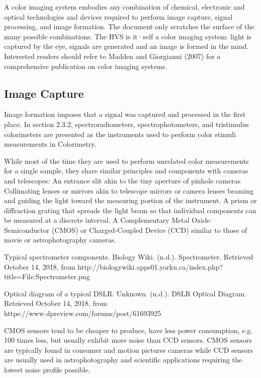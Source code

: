 A color imaging system embodies any combination of chemical, electronic and optical technologies and devices required to perform image capture, signal processing, and image formation. The document only scratches the surface of the many possible combinations. The HVS is it·self a color imaging system: light is captured by the eye, signals are generated and an image is formed in the mind. Interested readers should refer to Madden and Giorgianni (2007) for a comprehensive publication on color imaging systems.

\subsection{Image Capture}

Image formation imposes that a signal was captured and processed in the first place.
In section 2.3.2, spectroradiometers, spectrophotometers, and tristimulus colorimeters are presented as the instruments used to perform color stimuli measurements in Colorimetry.

While most of the time they are used to perform unrelated color measurements for a single sample, they share similar principles and components with cameras and telescopes:
An entrance slit akin to the tiny aperture of pinhole cameras
Collimating lenses or mirrors akin to telescope mirrors or camera lenses beaming and guiding the light toward the measuring portion of the instrument.
A prism or diffraction grating that spreads the light beam so that individual components can be measured at a discrete interval.
A Complementary Metal Oxide Semiconductor (CMOS) or Charged-Coupled Device (CCD) similar to those of movie or astrophotography cameras.

Typical spectrometer components.
Biology Wiki. (n.d.). Spectrometer. Retrieved October 14, 2018, from http://biologywiki.apps01.yorku.ca/index.php?title=File:Spectrometer.png



Optical diagram of a typical DSLR.
Unknown. (n.d.). DSLR Optical Diagram. Retrieved October 14, 2018, from https://www.dpreview.com/forums/post/61693925

CMOS sensors tend to be cheaper to produce, have less power consumption, e.g. 100 times less, but usually exhibit more noise than CCD sensors. CMOS sensors are typically found in consumer and motion pictures cameras while CCD sensors are usually used in astrophotography and scientific applications requiring the lowest noise profile possible. 

